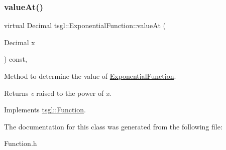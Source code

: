 \subsubsection{\texorpdfstring{value\+At()}{valueAt()}}
{\footnotesize\ttfamily virtual Decimal tsgl\+::\+Exponential\+Function\+::value\+At (\begin{DoxyParamCaption}\item[{Decimal}]{x }\end{DoxyParamCaption}) const\hspace{0.3cm}{\ttfamily [inline]}, {\ttfamily [virtual]}}



Method to determine the value of \hyperlink{classtsgl_1_1_exponential_function}{Exponential\+Function}. 

\begin{DoxyReturn}{Returns}
{\itshape e} raised to the power of {\itshape x}. 
\end{DoxyReturn}


Implements \hyperlink{classtsgl_1_1_function_affb7b3b19a04efefa29a9870d666e912}{tsgl\+::\+Function}.



The documentation for this class was generated from the following file\+:\begin{DoxyCompactItemize}
\item 
Function.\+h\end{DoxyCompactItemize}
